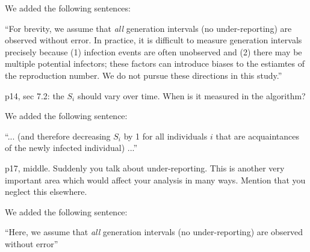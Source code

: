 \documentclass[12pt]{article}
\newcommand{\revtext}{\textsf}
\begin{document}
We added the following sentences:

``For brevity, we assume that \emph{all} generation intervals (no under-reporting) are observed without error.
In practice, it is difficult to measure generation intervals precisely because (1) infection events are often unobserved and (2) there may be multiple potential infectors; these factors can introduce biases to the estiamtes of the reproduction number.
We do not pursue these directions in this study.''

\revtext{p14, sec 7.2: the $S_i$ should vary over time. When is it measured in the algorithm?}

We added the following sentence:

``... (and therefore decreasing $S_i$ by 1 for all individuals $i$ that are acquaintances of the newly infected individual) ...''

\revtext{p17, middle. Suddenly you talk about under-reporting. This is another very important area which would affect your analysis in many ways. Mention that you neglect this elsewhere.
}

We added the following sentence:

``Here, we assume that \emph{all} generation intervals (no under-reporting) are observed without error''
\end{document}
